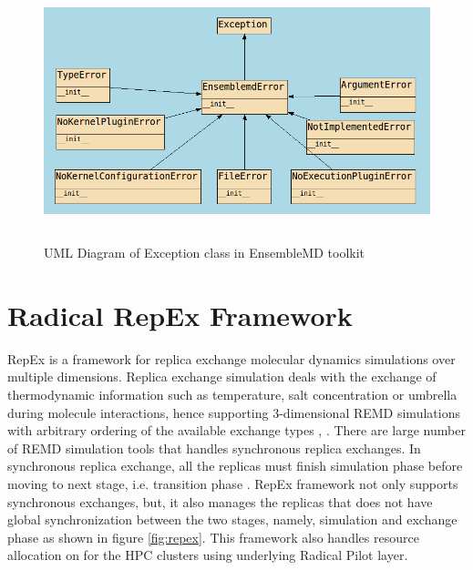 \documentclass[10pt]{ruthesis}
\begin{document}
\begin{figure}[h]
  \centering
  \includegraphics[width=12cm,height=7.5cm]{exception.png}
  \caption{UML Diagram of Exception class in EnsembleMD toolkit}
  \label{fig:umlexception}
\end{figure}


\section{Radical RepEx Framework}
RepEx is a framework for replica exchange molecular dynamics simulations over multiple dimensions. Replica exchange simulation deals with the exchange of thermodynamic information such as temperature, salt concentration or umbrella during molecule interactions, hence supporting 3-dimensional REMD simulations with arbitrary ordering of the available exchange types \cite{ref5}, \cite{site2}.  There are large number of REMD simulation tools that handles synchronous replica exchanges. In synchronous replica exchange, all the replicas must finish simulation phase before moving to next stage, i.e. transition phase \cite{ref5}. RepEx framework not only supports synchronous exchanges, but, it also manages the replicas that does not have global synchronization between the two stages, namely, simulation and exchange phase as shown in figure \ref{fig:repex}. This framework also handles resource allocation on for the HPC clusters using underlying Radical Pilot layer.
\end{document}

